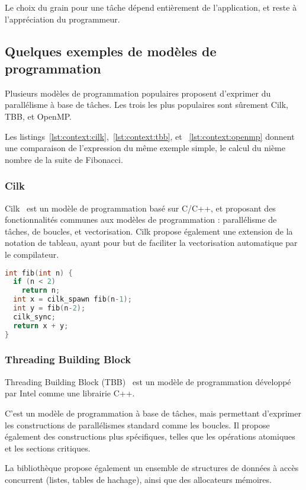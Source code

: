 Le choix du grain pour une tâche dépend entièrement de l'application, et reste à l'appréciation du programmeur.


\subsection{Quelques exemples de modèles de programmation}

Plusieurs modèles de programmation populaires proposent d'exprimer du parallélisme à base de tâches.
Les trois les plus populaires sont sûrement Cilk, TBB, et OpenMP.

Les listings~\ref{lst:context:cilk},~\ref{lst:context:tbb}, et ~\ref{lst:context:openmp} donnent une comparaison de l'expression du même exemple simple, le calcul du nième nombre de la suite de Fibonacci.

\subsubsection{Cilk}

Cilk~\cite{cilk5} est un modèle de programmation basé sur C/C++, et proposant des fonctionnalités communes aux modèles de programmation : parallélisme de tâches, de boucles, et vectorisation.
Cilk propose également une extension de la notation de tableau, ayant pour but de faciliter la vectorisation automatique par le compilateur.


\begin{lstlisting}[language=c++,caption=Fibonacci exprimé en Cilk,label=lst:context:cilk,basicstyle=\scriptsize]
int fib(int n) {
  if (n < 2)
    return n;
  int x = cilk_spawn fib(n-1);
  int y = fib(n-2);
  cilk_sync;
  return x + y;
}
\end{lstlisting}


\subsubsection{Threading Building Block}

Threading Building Block (TBB)~\cite{Reinders2007} est un modèle de programmation développé par Intel comme une librairie C++.

C'est un modèle de programmation à base de tâches, mais permettant d'exprimer les constructions de parallélismes standard comme les boucles. Il propose également des constructions plus spécifiques, telles que les opérations atomiques et les sections critiques.

La bibliothèque propose également un ensemble de structures de données à accès concurrent (listes, tables de hachage), ainsi que des allocateurs mémoires.

